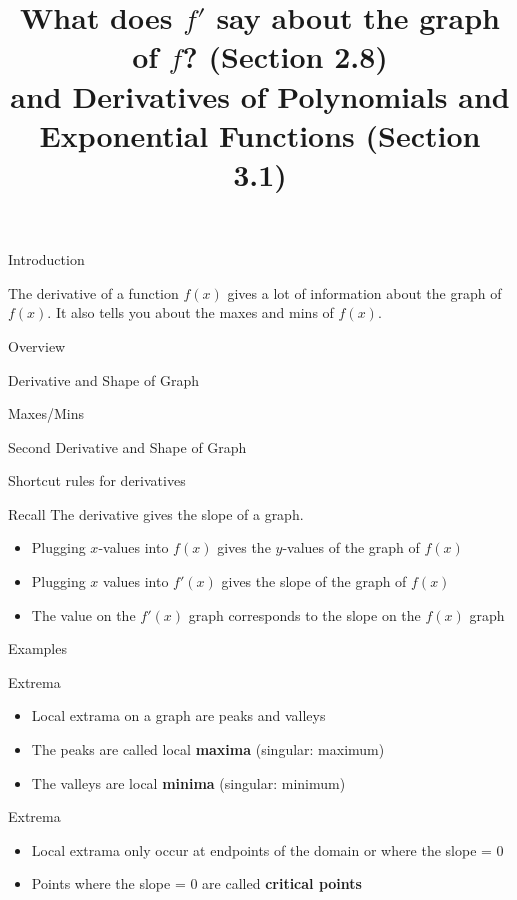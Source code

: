 \documentclass[t]{beamer}
\title{What does $f'$ say about the graph of $f$?  (Section 2.8) \\
and Derivatives of Polynomials and Exponential Functions (Section 3.1)}
\date{}
\newenvironment{fpi}
  {\itemize[nolistsep,itemsep=\fill]}
  {\vfill\enditemize}
\begin{document}
\frame{\titlepage}

\begin{frame}{Introduction}
\begin{fpi}
\item The derivative of a function $f(x)$ gives a lot of information about the graph of $f(x)$.  It also tells you about the maxes and mins of $f(x)$.
\end{fpi}
\end{frame}

\begin{frame}{Overview}
\begin{fpi}
\item Derivative and Shape of Graph
\item Maxes/Mins
\item Second Derivative and Shape of Graph
\item Shortcut rules for derivatives
\end{fpi}
\end{frame}

\begin{frame}{Recall}
The derivative gives the slope of a graph.
\begin{itemize}
\item Plugging $x$-values into $f(x)$ gives the $y$-values of the graph of $f(x)$
\item Plugging $x$ values into $f'(x)$ gives the slope of the graph of $f(x)$
\item The value on the $f'(x)$ graph corresponds to the slope on the $f(x)$ graph
\end{itemize}
\end{frame}

\begin{frame}{Examples}
\end{frame}

\begin{frame}{Extrema}
\begin{itemize}
\item Local extrama on a graph are peaks and valleys
\item The peaks are called local \textbf{maxima} (singular: maximum)
\item The valleys are local \textbf{minima} (singular: minimum)
\end{itemize}
\end{frame}

\begin{frame}{Extrema}
\begin{itemize}
\item Local extrama only occur at endpoints of the domain or
where the slope = 0
\item Points where the slope = 0 are called \textbf{critical points}
\end{itemize}
\end{frame}
\end{document}

